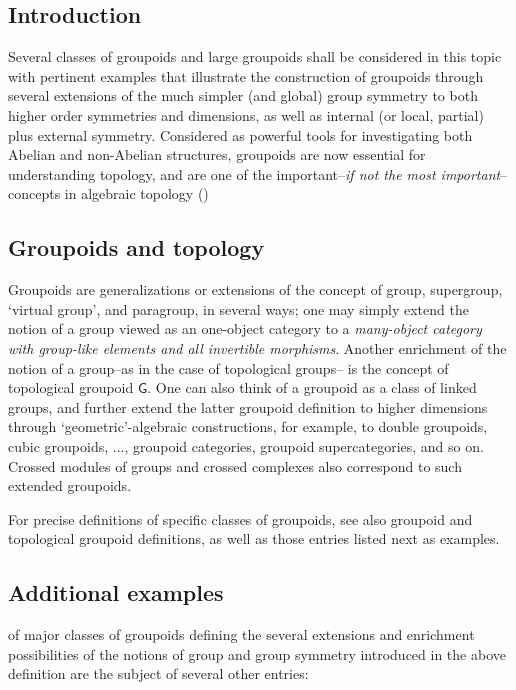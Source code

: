 \documentclass[12pt]{article}
\theoremstyle{plain}
\theoremstyle{definition}
\numberwithin{equation}{section}
\begin{document}
\subsection{Introduction}

Several classes of groupoids and large groupoids shall be considered in this topic with pertinent examples that illustrate the construction of groupoids through several extensions of the much simpler (and global) group symmetry to both higher order symmetries and dimensions, as well as internal (or local, partial) plus external symmetry. Considered as powerful tools for investigating both Abelian and non-Abelian structures, groupoids are now essential for understanding topology, and are one of the important--\emph{if not the most important}-- concepts in algebraic topology (\cite{BR2006})

\subsection{Groupoids and topology}  

  Groupoids are {generalizations or extensions of the concept of group, supergroup, `virtual group', and paragroup}, in several ways; one may simply extend the notion of a group viewed as an one-object category to a \emph{many-object category with group-like elements and all invertible morphisms}. Another enrichment of the notion of a group--as in the case of topological groups-- is the concept of topological groupoid $\mathsf{G}$. One can also think of a groupoid as a class of linked groups, and further extend the latter groupoid definition to higher dimensions through `geometric'-algebraic constructions, for example, to double groupoids, cubic groupoids, ..., groupoid categories, groupoid supercategories, and so on. Crossed modules of groups and crossed complexes also correspond to such extended groupoids.

  For precise definitions of specific classes of groupoids, see also groupoid and topological groupoid definitions,
as well as those entries listed next as examples. 

\subsection{Additional examples} of major classes of groupoids defining the several extensions and enrichment possibilities of the notions of group and group symmetry introduced in the above definition are the subject of several other entries:
\end{document}
